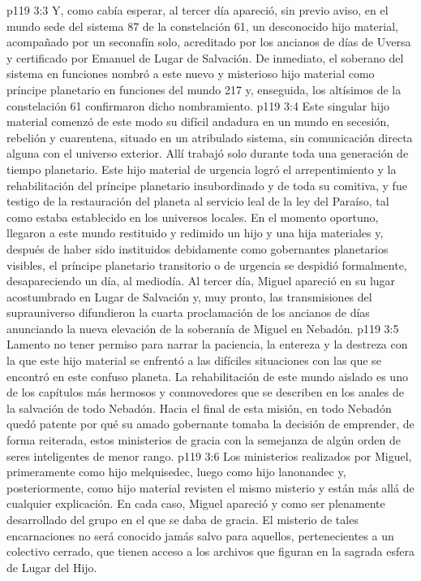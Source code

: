 \vs p119 3:3 Y, como cabía esperar, al tercer día apareció, sin previo aviso, en el mundo sede del sistema 87 de la constelación 61, un desconocido hijo material, acompañado por un seconafín solo, acreditado por los ancianos de días de Uversa y certificado por Emanuel de Lugar de Salvación. De inmediato, el soberano del sistema en funciones nombró a este nuevo y misterioso hijo material como príncipe planetario en funciones del mundo 217 y, enseguida, los altísimos de la constelación 61 confirmaron dicho nombramiento.
\vs p119 3:4 Este singular hijo material comenzó de este modo su difícil andadura en un mundo en secesión, rebelión y cuarentena, situado en un atribulado sistema, sin comunicación directa alguna con el universo exterior. Allí trabajó solo durante toda una generación de tiempo planetario. Este hijo material de urgencia logró el arrepentimiento y la rehabilitación del príncipe planetario insubordinado y de toda su comitiva, y fue testigo de la restauración del planeta al servicio leal de la ley del Paraíso, tal como estaba establecido en los universos locales. En el momento oportuno, llegaron a este mundo restituido y redimido un hijo y una hija materiales y, después de haber sido instituidos debidamente como gobernantes planetarios visibles, el príncipe planetario transitorio o de urgencia se despidió formalmente, desapareciendo un día, al mediodía. Al tercer día, Miguel apareció en su lugar acostumbrado en Lugar de Salvación y, muy pronto, las transmisiones del suprauniverso difundieron la cuarta proclamación de los ancianos de días anunciando la nueva elevación de la soberanía de Miguel en Nebadón.
\vs p119 3:5 Lamento no tener permiso para narrar la paciencia, la entereza y la destreza con la que este hijo material se enfrentó a las difíciles situaciones con las que se encontró en este confuso planeta. La rehabilitación de este mundo aislado es uno de los capítulos más hermosos y conmovedores que se describen en los anales de la salvación de todo Nebadón. Hacia el final de esta misión, en todo Nebadón quedó patente por qué su amado gobernante tomaba la decisión de emprender, de forma reiterada, estos ministerios de gracia con la semejanza de algún orden de seres inteligentes de menor rango.
\vs p119 3:6 \pc Los ministerios realizados por Miguel, primeramente como hijo melquisedec, luego como hijo lanonandec y, posteriormente, como hijo material revisten el mismo misterio y están más allá de cualquier explicación. En cada caso, Miguel apareció  y como ser plenamente desarrollado del grupo en el que se daba de gracia. El misterio de tales encarnaciones no será conocido jamás salvo para aquellos, pertenecientes a un colectivo cerrado, que tienen acceso a los archivos que figuran en la sagrada esfera de Lugar del Hijo.
